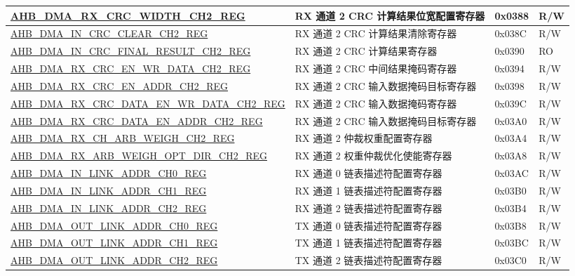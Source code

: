 \begin{longtable}{ | l | l | p{1.3cm} | l | }
\hyperref[regdesc:AHBDMARXCRCWIDTHCHNREG]{AHB\_DMA\_RX\_CRC\_WIDTH\_CH2\_REG} & RX 通道 2 CRC 计算结果位宽配置寄存器 & 0x0388 & R/W \\ \hline
\hyperref[regdesc:AHBDMAINCRCCLEARCHNREG]{AHB\_DMA\_IN\_CRC\_CLEAR\_CH2\_REG} & RX 通道 2 CRC 计算结果清除寄存器 & 0x038C & R/W \\ \hline
\hyperref[regdesc:AHBDMAINCRCFINALRESULTCHNREG]{AHB\_DMA\_IN\_CRC\_FINAL\_RESULT\_CH2\_REG} & RX 通道 2 CRC 计算结果寄存器 & 0x0390 & RO \\ \hline
\hyperref[regdesc:AHBDMARXCRCENWRDATACHNREG]{AHB\_DMA\_RX\_CRC\_EN\_WR\_DATA\_CH2\_REG} & RX 通道 2 CRC 中间结果掩码寄存器 & 0x0394 & R/W \\ \hline
\hyperref[regdesc:AHBDMARXCRCENADDRCHNREG]{AHB\_DMA\_RX\_CRC\_EN\_ADDR\_CH2\_REG} & RX 通道 2 CRC 输入数据掩码目标寄存器 & 0x0398 & R/W \\ \hline
\hyperref[regdesc:AHBDMARXCRCDATAENWRDATACHNREG]{AHB\_DMA\_RX\_CRC\_DATA\_EN\_WR\_DATA\_CH2\_REG} & RX 通道 2 CRC 输入数据掩码寄存器 & 0x039C & R/W \\ \hline
\hyperref[regdesc:AHBDMARXCRCDATAENADDRCHNREG]{AHB\_DMA\_RX\_CRC\_DATA\_EN\_ADDR\_CH2\_REG} & RX 通道 2 CRC 输入数据掩码目标寄存器& 0x03A0 & R/W \\ \hline
\hyperref[regdesc:AHBDMARXCHARBWEIGHCHNREG]{AHB\_DMA\_RX\_CH\_ARB\_WEIGH\_CH2\_REG} & RX 通道 2 仲裁权重配置寄存器 & 0x03A4 & R/W \\ \hline
\hyperref[regdesc:AHBDMARXARBWEIGHOPTDIRCHNREG]{AHB\_DMA\_RX\_ARB\_WEIGH\_OPT\_DIR\_CH2\_REG} & RX 通道 2 权重仲裁优化使能寄存器 & 0x03A8 & R/W \\ \hline
\hyperref[regdesc:AHBDMAINLINKADDRCHNREG]{AHB\_DMA\_IN\_LINK\_ADDR\_CH0\_REG} & RX 通道 0 链表描述符配置寄存器 & 0x03AC & R/W \\ \hline
\hyperref[regdesc:AHBDMAINLINKADDRCHNREG]{AHB\_DMA\_IN\_LINK\_ADDR\_CH1\_REG} & RX 通道 1 链表描述符配置寄存器 & 0x03B0 & R/W \\ \hline
\hyperref[regdesc:AHBDMAINLINKADDRCHNREG]{AHB\_DMA\_IN\_LINK\_ADDR\_CH2\_REG} & RX 通道 2 链表描述符配置寄存器 & 0x03B4 & R/W \\ \hline
\hyperref[regdesc:AHBDMAOUTLINKADDRCHNREG]{AHB\_DMA\_OUT\_LINK\_ADDR\_CH0\_REG} & TX 通道 0 链表描述符配置寄存器 & 0x03B8 & R/W \\ \hline
\hyperref[regdesc:AHBDMAOUTLINKADDRCHNREG]{AHB\_DMA\_OUT\_LINK\_ADDR\_CH1\_REG} & TX 通道 1 链表描述符配置寄存器 & 0x03BC & R/W \\ \hline
\hyperref[regdesc:AHBDMAOUTLINKADDRCHNREG]{AHB\_DMA\_OUT\_LINK\_ADDR\_CH2\_REG} & TX 通道 2 链表描述符配置寄存器 & 0x03C0 & R/W \\ \hline

\end{longtable}
